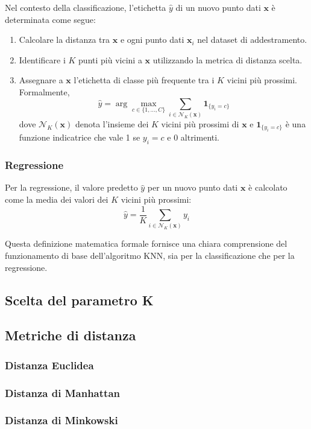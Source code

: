 Nel contesto della classificazione, l'etichetta \( \hat{y} \) di un nuovo punto dati \( \mathbf{x} \) è determinata come segue:
\begin{enumerate}
    \item Calcolare la distanza tra \( \mathbf{x} \) e ogni punto dati \( \mathbf{x}_i \) nel dataset di addestramento.
    \item Identificare i \( K \) punti più vicini a \( \mathbf{x} \) utilizzando la metrica di distanza scelta.
    \item Assegnare a \( \mathbf{x} \) l'etichetta di classe più frequente tra i \( K \) vicini più prossimi. Formalmente,
    \[
    \hat{y} = \arg\max_{c \in \{1, \ldots, C\}} \sum_{i \in \mathcal{N}_K(\mathbf{x})} \mathbf{1}_{\{y_i = c\}}
    \]
    dove \( \mathcal{N}_K(\mathbf{x}) \) denota l'insieme dei \( K \) vicini più prossimi di \( \mathbf{x} \) e \( \mathbf{1}_{\{y_i = c\}} \) è una funzione indicatrice che vale 1 se \( y_i = c \) e 0 altrimenti.
\end{enumerate}

\subsubsection{Regressione}

Per la regressione, il valore predetto \( \hat{y} \) per un nuovo punto dati \( \mathbf{x} \) è calcolato come la media dei valori dei \( K \) vicini più prossimi:
\[
\hat{y} = \frac{1}{K} \sum_{i \in \mathcal{N}_K(\mathbf{x})} y_i
\]

Questa definizione matematica formale fornisce una chiara comprensione del funzionamento di base dell'algoritmo KNN, sia per la classificazione che per la regressione.

\subsection{Scelta del parametro K}
\subsection{Metriche di distanza}
\subsubsection{Distanza Euclidea}
\subsubsection{Distanza di Manhattan}
\subsubsection{Distanza di Minkowski}
